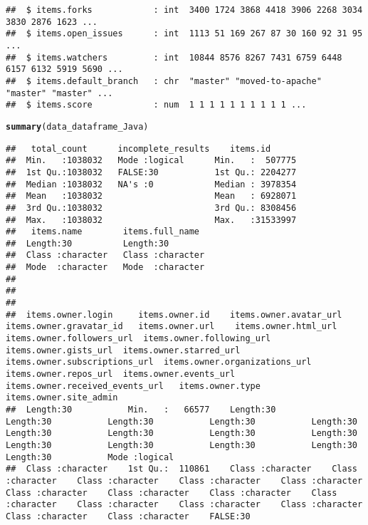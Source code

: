 \documentclass{article}\usepackage[]{graphicx}\usepackage[]{color}
\makeatletter
\newcommand{\hlstd}[1]{\textcolor[rgb]{0.345,0.345,0.345}{#1}}%
\newcommand{\hlkwd}[1]{\textcolor[rgb]{0.737,0.353,0.396}{\textbf{#1}}}%
\newenvironment{kframe}{%
 \def\at@end@of@kframe{}%
 \ifinner\ifhmode%
  \def\at@end@of@kframe{\end{minipage}}%
  \begin{minipage}{\columnwidth}%
 \fi\fi%
 \def\FrameCommand##1{\hskip\@totalleftmargin \hskip-\fboxsep
 \colorbox{shadecolor}{##1}\hskip-\fboxsep
     \hskip-\linewidth \hskip-\@totalleftmargin \hskip\columnwidth}%
 \MakeFramed {\advance\hsize-\width
   \@totalleftmargin\z@ \linewidth\hsize
   \@setminipage}}%
 {\par\unskip\endMakeFramed%
 \at@end@of@kframe}
\newenvironment{knitrout}{}{} %
\makeatother
\begin{document}
\begin{knitrout}
\begin{kframe}
\begin{verbatim}
##  $ items.forks            : int  3400 1724 3868 4418 3906 2268 3034 3830 2876 1623 ...
##  $ items.open_issues      : int  1113 51 169 267 87 30 160 92 31 95 ...
##  $ items.watchers         : int  10844 8576 8267 7431 6759 6448 6157 6132 5919 5690 ...
##  $ items.default_branch   : chr  "master" "moved-to-apache" "master" "master" ...
##  $ items.score            : num  1 1 1 1 1 1 1 1 1 1 ...
\end{verbatim}
\begin{alltt}
\hlkwd{summary}\hlstd{(data_dataframe_Java)}
\end{alltt}
\begin{verbatim}
##   total_count      incomplete_results    items.id       
##  Min.   :1038032   Mode :logical      Min.   :  507775  
##  1st Qu.:1038032   FALSE:30           1st Qu.: 2204277  
##  Median :1038032   NA's :0            Median : 3978354  
##  Mean   :1038032                      Mean   : 6928071  
##  3rd Qu.:1038032                      3rd Qu.: 8308456  
##  Max.   :1038032                      Max.   :31533997  
##   items.name        items.full_name   
##  Length:30          Length:30         
##  Class :character   Class :character  
##  Mode  :character   Mode  :character  
##                                       
##                                       
##                                       
##  items.owner.login     items.owner.id    items.owner.avatar_url  items.owner.gravatar_id   items.owner.url    items.owner.html_url  items.owner.followers_url  items.owner.following_url  items.owner.gists_url  items.owner.starred_url  items.owner.subscriptions_url  items.owner.organizations_url  items.owner.repos_url  items.owner.events_url  items.owner.received_events_url   items.owner.type   items.owner.site_admin
##  Length:30           Min.   :   66577    Length:30           Length:30           Length:30           Length:30           Length:30           Length:30           Length:30           Length:30           Length:30           Length:30           Length:30           Length:30           Length:30           Length:30           Mode :logical                                                                                    
##  Class :character    1st Qu.:  110861    Class :character    Class :character    Class :character    Class :character    Class :character    Class :character    Class :character    Class :character    Class :character    Class :character    Class :character    Class :character    Class :character    Class :character    FALSE:30                                                                                         

\end{verbatim}
\end{kframe}
\end{knitrout}
\end{document}
